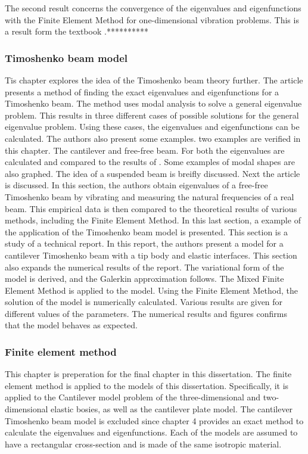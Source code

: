 \documentclass[../main.tex]{subfiles}
\begin{document}
The second result concerns the convergence of the eigenvalues and eigenfunctions with the Finite Element Method for one-dimensional vibration problems. This is a result form the textbook \cite{SF97}.**********


\subsubsection{Timoshenko beam model}

Tis chapter explores the idea of the Timoshenko beam theory further. The article \cite{VV06} presents a method of finding the exact eigenvalues and eigenfunctions for a Timoshenko beam. The method uses modal analysis to solve a general eigenvalue problem. This results in three different cases of possible solutions for the general eigenvalue problem. Using these cases, the eigenvalues and eigenfunctions can be calculated. The authors also present some examples. two examples are verified in this chapter. The cantilever and free-free beam. For both the eigenvalues are calculated and compared to the results of \cite{VV06}. Some examples of modal shapes are also graphed. The idea of a suspended beam is breifly discussed. Next the article \cite{SP06} is discussed. In this section, the authors obtain eigenvalues of a free-free Timoshenko beam by vibrating and measuring the natural frequencies of a real beam. This empirical data is then compared to the theoretical results of various methods, including the Finite Element Method. In this last section, a example of the application of the Timoshenko beam model is presented. This section is a study of a technical report. In this report, the authors present a model for a cantilever Timoshenko beam with a tip body and elastic interfaces. This section also expands the numerical results of the report. The variational form of the model is derived, and the Galerkin approximation follows. The Mixed Finite Element Method is applied to the model. Using the Finite Element Method, the solution of the model is numerically calculated. Various results are given for different values of the parameters. The numerical results and figures confirms that the model behaves as expected. 

\subsubsection{Finite element method}
This chapter is preperation for the final chapter in this dissertation. The finite element method is applied to the models of this dissertation. Specifically, it is applied to the Cantilever model problem of the three-dimensional and two-dimensional elastic bosies, as well as the cantilever plate model. The cantilever Timoshenko beam model is excluded since chapter 4 provides an exact method to calculate the eigenvalues and eigenfunctions. Each of the models are assumed to have a rectangular cross-section and is made of the same isotropic material.
\end{document}
